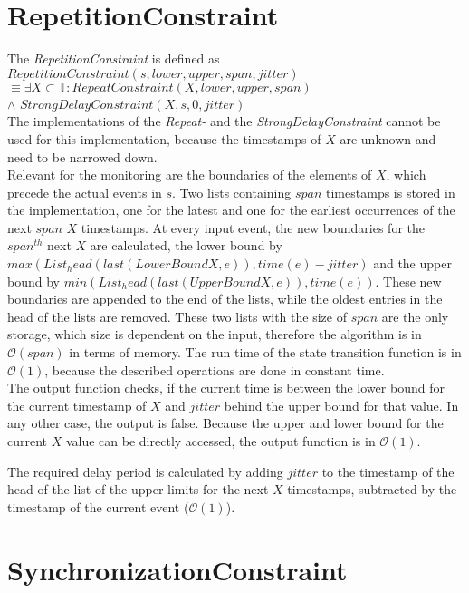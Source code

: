 \section{RepetitionConstraint}
	The  \emph{RepetitionConstraint} is defined as\\[10pt]
		$RepetitionConstraint(s, lower, upper, span, jitter)$\\
		$\equiv \exists X\subset \mathbb{T}: RepeatConstraint (X, lower, upper, span)$\\
		\hspace{7cm}$\land$ $StrongDelayConstraint(X, s, 0, jitter)$\\[10pt]
	The implementations of the \emph{Repeat-} and the \emph{StrongDelayConstraint} cannot be used for this implementation, because the timestamps of $X$ are unknown and need to be narrowed down.\\
	Relevant for the monitoring are the boundaries of the elements of $X$, which precede the actual events in $s$. Two lists containing $span$ timestamps is stored in the implementation, one for the latest and one for the earliest occurrences of the next $span$ $X$ timestamps. At every input event, the new boundaries for the $span^{th}$ next $X$ are calculated, the lower bound by $max(List_head(last(LowerBoundX, e)), time(e)-jitter)$ and the upper bound by $min(List_head(last(UpperBoundX, e)), time(e))$. These new boundaries are appended to the end of the lists, while the oldest entries in the head of the lists are removed. These two lists with the size of $span$ are the only storage, which size is dependent on the input, therefore the algorithm is in $\mathcal{O}(span)$ in terms of memory. The run time of the state transition function is in $\mathcal{O}(1)$, because the described operations are done in constant time.\\
	The output function checks, if the current time is between the lower bound for the current timestamp of $X$ and $jitter$ behind the upper bound for that value. In any other case, the output is false. Because the upper and lower bound for the current $X$ value can be directly accessed, the output function is in $\mathcal{O}(1)$.
	
	The required delay period is calculated by adding $jitter$ to the timestamp of the head of the list of the upper limits for the next $X$ timestamps, subtracted by the timestamp of the current event ($\mathcal{O}(1)$).
	
\section{SynchronizationConstraint}
